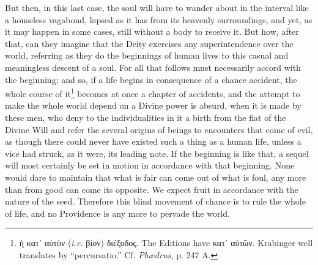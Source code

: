 But then, in this last case, the soul will have to wander about in the interval like a houseless vagabond, lapsed as it has from its heavenly surroundings, and yet, as it may happen in some cases, still without a body to receive it. But how, after that, can they imagine that the Deity exercises any superintendence over the world, referring as they do the beginnings of human lives to this casual and meaningless descent of a soul. For all that follows must necessarily accord with the beginning; and so, if a life begins in consequence of a chance accident, the whole course of it\footnote{\textgreek{ἡ κατ᾽ αὐτὸν} (\emph{i.e.} \textgreek{βίον}) \textgreek{διέξοδος}. The Editions have \textgreek{κατ᾽ αὐτῶν}. Krabinger well translates by “percursatio.” Cf. \emph{Phædrus,} p. 247 A.} becomes at once a chapter of accidents, and the attempt to make the whole world depend on a Divine power is absurd, when it is made by these men, who deny to the individualities in it a birth from the fiat of the Divine Will and refer the several origins of beings to encounters that come of evil, as though there could never have existed such a thing as a human life, unless a vice had struck, as it were, its leading note. If the beginning is like that, a sequel will most certainly be set in motion in accordance with that beginning. None would dare to maintain that what is fair can come out of what is foul, any more than from good can come its opposite. We expect fruit in accordance with the nature of the seed. Therefore this blind movement of chance is to rule the whole of life, and no Providence is any more to pervade the world.

